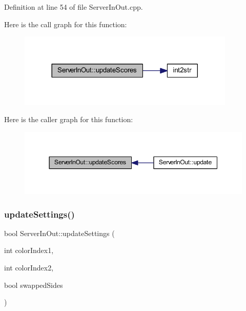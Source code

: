 Definition at line 54 of file Server\+In\+Out.\+cpp.

Here is the call graph for this function\+:
\nopagebreak
\begin{figure}[H]
\begin{center}
\leavevmode
\includegraphics[width=293pt]{class_server_in_out_aaa8e027abfe326208f48890b7e225672_cgraph}
\end{center}
\end{figure}
Here is the caller graph for this function\+:
\nopagebreak
\begin{figure}[H]
\begin{center}
\leavevmode
\includegraphics[width=350pt]{class_server_in_out_aaa8e027abfe326208f48890b7e225672_icgraph}
\end{center}
\end{figure}
\mbox{\label{class_server_in_out_a687c760ff3ad5f33c6d157d9eaefc262}} 
\subsubsection{\texorpdfstring{update\+Settings()}{updateSettings()}}
{\footnotesize\ttfamily bool Server\+In\+Out\+::update\+Settings (\begin{DoxyParamCaption}\item[{int}]{color\+Index1,  }\item[{int}]{color\+Index2,  }\item[{bool}]{swapped\+Sides }\end{DoxyParamCaption})\hspace{0.3cm}{\ttfamily [private]}}



